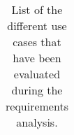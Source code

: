 \begin{landscape}
\begin{longtable}{ l c p{8cm} l l p{3cm} }
		\caption{List of the different use cases that have been evaluated during the requirements analysis.}	
		\label{tab:usecases}
	\end{longtable}
\end{landscape}